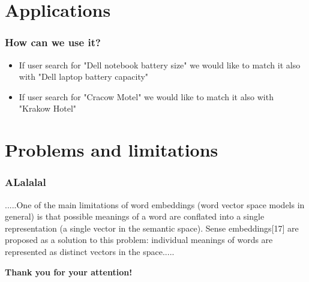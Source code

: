 
\section{Applications}


\begin{frame}
	\frametitle{How can we use it?}
	
	\begin{itemize}
		\item If user search for "Dell notebook battery size" we would like to match it also with "Dell laptop battery capacity"
		\item If user search for "Cracow Motel" we would like to match it also with "Krakow Hotel"
	\end{itemize}
	
\end{frame}


\section{Problems and limitations}


\begin{frame}
\frametitle{ALalalal}
\begin{center}
	.....One of the main limitations of word embeddings (word vector space models in general) is that possible meanings of a word are conflated into a single representation (a single vector in the semantic space). Sense embeddings[17] are proposed as a solution to this problem: individual meanings of words are represented as distinct vectors in the space.....
	
\end{center}

\end{frame}

\begin{frame}

\begin{center}
	\Huge \textbf{Thank you for your attention!}
\end{center}

\end{frame}

